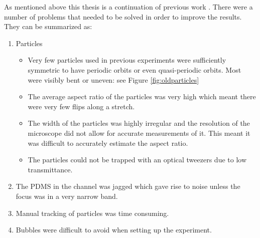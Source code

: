 As mentioned above this thesis is a continuation of previous work \cite{AntonThesis, JonasExperiment, Mishra}. There were a number of problems that needed to be solved in order to improve the results. They can be summarized as:
\begin{enumerate} \label{list:problems}
	\item Particles 
	\begin{itemize}
		\item Very few particles used in previous experiments were sufficiently symmetric to have periodic orbits or even quasi-periodic orbits. Most were visibly bent or uneven: see Figure \ref{fig:oldparticles}
		\item The average aspect ratio of the particles was very high which meant there were very few flips along a stretch.
		\item The width of the particles was highly irregular and the resolution of the microscope did not allow for accurate measurements of it. This meant it was difficult to accurately estimate the aspect ratio.
		\item The particles could not be trapped with an optical tweezers due to low transmittance.
	\end{itemize}
	\item The PDMS in the channel was jagged which gave rise to noise unless the focus was in a very narrow band.
	\item Manual tracking of particles was time consuming.
	\item Bubbles were difficult to avoid when setting up the experiment.
\end{enumerate}